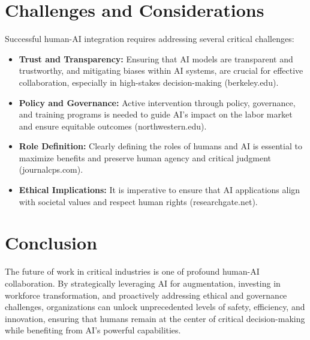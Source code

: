 \section{Challenges and Considerations}
Successful human-AI integration requires addressing several critical challenges:
\begin{itemize}
    \item \textbf{Trust and Transparency:} Ensuring that AI models are transparent and trustworthy, and mitigating biases within AI systems, are crucial for effective collaboration, especially in high-stakes decision-making (berkeley.edu).
    \item \textbf{Policy and Governance:} Active intervention through policy, governance, and training programs is needed to guide AI's impact on the labor market and ensure equitable outcomes (northwestern.edu).
    \item \textbf{Role Definition:} Clearly defining the roles of humans and AI is essential to maximize benefits and preserve human agency and critical judgment (journalcps.com).
    \item \textbf{Ethical Implications:} It is imperative to ensure that AI applications align with societal values and respect human rights (researchgate.net).
\end{itemize}

\section{Conclusion}
The future of work in critical industries is one of profound human-AI collaboration. By strategically leveraging AI for augmentation, investing in workforce transformation, and proactively addressing ethical and governance challenges, organizations can unlock unprecedented levels of safety, efficiency, and innovation, ensuring that humans remain at the center of critical decision-making while benefiting from AI's powerful capabilities.
